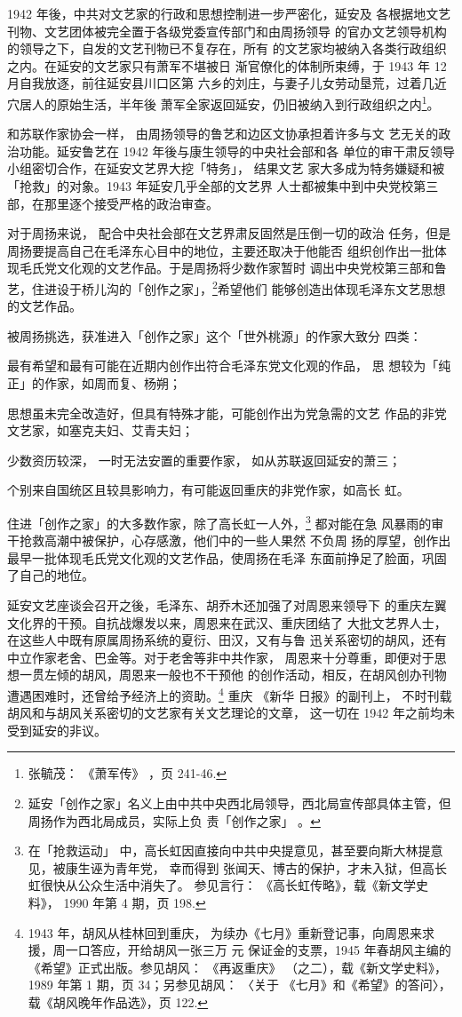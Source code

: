1942 年後，中共对文艺家的行政和思想控制进一步严密化，延安及
各根据地文艺刊物、文艺团体被完全置于各级党委宣传部门和由周扬领导
的官办文艺领导机构的领导之下，自发的文艺刊物已不复存在，所有
的文艺家均被纳入各类行政组织之内。在延安的文艺家只有萧军不堪被日
渐官僚化的体制所束缚，于 1943 年 12 月自我放逐，前往延安县川口区第
六乡的刘庄，与妻子儿女劳动垦荒，过着几近穴居人的原始生活，半年後
萧军全家返回延安，仍旧被纳入到行政组织之内\footnote{张毓茂：
《萧军传》
，页 241-46.}。

和苏联作家协会一样，
由周扬领导的鲁艺和边区文协承担着许多与文
艺无关的政治功能。延安鲁艺在 1942 年後与康生领导的中央社会部和各
单位的审干肃反领导小组密切合作，在延安文艺界大挖「特务」，
结果文艺
家大多成为特务嫌疑和被「抢救」的对象。1943 年延安几乎全部的文艺界
人士都被集中到中央党校第三部，在那里逐个接受严格的政治审查。

对于周扬来说，
配合中央社会部在文艺界肃反固然是压倒一切的政治
任务，但是周扬要提高自己在毛泽东心目中的地位，主要还取决于他能否
组织创作出一批体现毛氏党文化观的文艺作品。于是周扬将少数作家暂时
调出中央党校第三部和鲁艺，住进设于桥儿沟的「创作之家」，\footnote{延安「创作之家」名义上由中共中央西北局领导，西北局宣传部具体主管，但周扬作为西北局成员，实际上负
责「创作之家」
。}希望他们
能够创造出体现毛泽东文艺思想的文艺作品。

被周扬挑选，获准进入「创作之家」这个「世外桃源」的作家大致分
四类：

最有希望和最有可能在近期内创作出符合毛泽东党文化观的作品，
思
想较为「纯正」的作家，如周而复、杨朔；

思想虽未完全改造好，但具有特殊才能，可能创作出为党急需的文艺
作品的非党文艺家，如塞克夫妇、艾青夫妇；

少数资历较深，
一时无法安置的重要作家，
如从苏联返回延安的萧三；

个别来自国统区且较具影响力，有可能返回重庆的非党作家，如高长
虹。


住进「创作之家」的大多数作家，除了高长虹一人外，\footnote{在「抢救运动」
中，高长虹因直接向中共中央提意见，甚至要向斯大林提意见，被康生诬为青年党，
幸而得到 张闻天、博古的保护，才未入狱，但高长虹很快从公众生活中消失了。
参见言行： 《高长虹传略》，载《新文学史料》， 1990 年第 4 期，页 198.
} 都对能在急 风暴雨的审干抢救高潮中被保护，心存感激，他们中的一些人果然
不负周 扬的厚望，创作出最早一批体现毛氏党文化观的文艺作品，使周扬在毛泽
东面前挣足了脸面，巩固了自己的地位。

延安文艺座谈会召开之後，毛泽东、胡乔木还加强了对周恩来领导下 的重庆左翼
文化界的干预。自抗战爆发以来，周恩来在武汉、重庆团结了 大批文艺界人士，
在这些人中既有原属周扬系统的夏衍、田汉，又有与鲁 迅关系密切的胡风，还有
中立作家老舍、巴金等。对于老舍等非中共作家， 周恩来十分尊重，即便对于思
想一贯左倾的胡风，周恩来一般也不干预他 的创作活动，相反，在胡风创办刊物
遭遇困难时，还曾给予经济上的资助。\footnote{1943 年，胡风从桂林回到重庆，
为续办《七月》重新登记事，向周恩来求援，周一口答应，开给胡风一张三万 元
保证金的支票，1945 年春胡风主编的《希望》正式出版。参见胡风： 《再返重庆》
（之二），载《新文学史料》，1989 年第 1 期，页 34；另参见胡风： 〈关于
《七月》和《希望》的答问〉，载《胡风晚年作品选》，页 122.} 重庆 《新华
日报》的副刊上， 不时刊载胡风和与胡风关系密切的文艺家有关文艺理论的文章，
这一切在 1942 年之前均未受到延安的非议。

